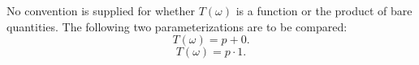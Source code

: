 \documentclass{article}
\begin{document}
No convention is supplied for whether $T(\omega)$ is a function or the
product of bare quantities.  The following two parameterizations are to be
compared:
\begin{equation}
T(\omega)=p+0 .\label{single-one}
\end{equation}
\begin{equation}
T(\omega)=p\cdot1 .\label{single-two}
\end{equation}
\end{document}
